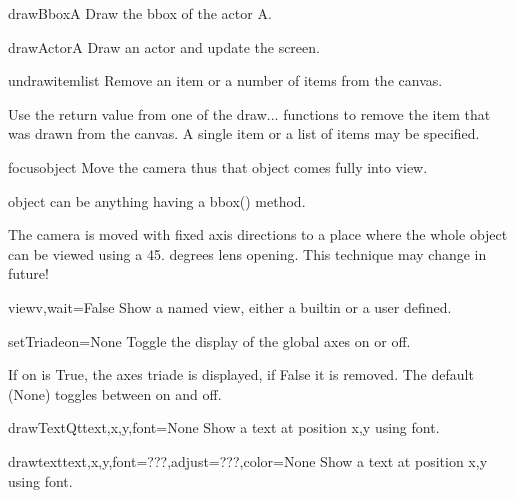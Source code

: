 \begin{funcdesc}{drawBbox}{A}
Draw the bbox of the actor A.

\end{funcdesc}


\begin{funcdesc}{drawActor}{A}
Draw an actor and update the screen.

\end{funcdesc}


\begin{funcdesc}{undraw}{itemlist}
Remove an item or a number of items from the canvas.

    Use the return value from one of the draw... functions to remove
    the item that was drawn from the canvas.
    A single item or a list of items may be specified.
    

\end{funcdesc}


\begin{funcdesc}{focus}{object}
Move the camera thus that object comes fully into view.

    object can be anything having a bbox() method.

    The camera is moved with fixed axis directions to a place
    where the whole object can be viewed using a 45. degrees lens opening.
    This technique may change in future!
    

\end{funcdesc}


\begin{funcdesc}{view}{v,wait=False}
Show a named view, either a builtin or a user defined.

\end{funcdesc}


\begin{funcdesc}{setTriade}{on=None}
Toggle the display of the global axes on or off.

    If on is True, the axes triade is displayed, if False it is
    removed. The default (None) toggles between on and off.
    

\end{funcdesc}


\begin{funcdesc}{drawTextQt}{text,x,y,font=None}
Show a text at position x,y using font.

\end{funcdesc}


\begin{funcdesc}{drawtext}{text,x,y,font=???,adjust=???,color=None}
Show a text at position x,y using font.

\end{funcdesc}


